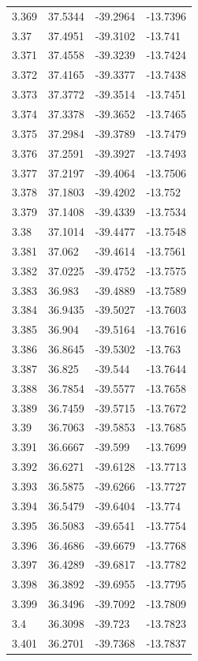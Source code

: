 \begin{tabular}{llll}
3.369 & 37.5344 & -39.2964 & -13.7396 \\
3.37 & 37.4951 & -39.3102 & -13.741 \\
3.371 & 37.4558 & -39.3239 & -13.7424 \\
3.372 & 37.4165 & -39.3377 & -13.7438 \\
3.373 & 37.3772 & -39.3514 & -13.7451 \\
3.374 & 37.3378 & -39.3652 & -13.7465 \\
3.375 & 37.2984 & -39.3789 & -13.7479 \\
3.376 & 37.2591 & -39.3927 & -13.7493 \\
3.377 & 37.2197 & -39.4064 & -13.7506 \\
3.378 & 37.1803 & -39.4202 & -13.752 \\
3.379 & 37.1408 & -39.4339 & -13.7534 \\
3.38 & 37.1014 & -39.4477 & -13.7548 \\
3.381 & 37.062 & -39.4614 & -13.7561 \\
3.382 & 37.0225 & -39.4752 & -13.7575 \\
3.383 & 36.983 & -39.4889 & -13.7589 \\
3.384 & 36.9435 & -39.5027 & -13.7603 \\
3.385 & 36.904 & -39.5164 & -13.7616 \\
3.386 & 36.8645 & -39.5302 & -13.763 \\
3.387 & 36.825 & -39.544 & -13.7644 \\
3.388 & 36.7854 & -39.5577 & -13.7658 \\
3.389 & 36.7459 & -39.5715 & -13.7672 \\
3.39 & 36.7063 & -39.5853 & -13.7685 \\
3.391 & 36.6667 & -39.599 & -13.7699 \\
3.392 & 36.6271 & -39.6128 & -13.7713 \\
3.393 & 36.5875 & -39.6266 & -13.7727 \\
3.394 & 36.5479 & -39.6404 & -13.774 \\
3.395 & 36.5083 & -39.6541 & -13.7754 \\
3.396 & 36.4686 & -39.6679 & -13.7768 \\
3.397 & 36.4289 & -39.6817 & -13.7782 \\
3.398 & 36.3892 & -39.6955 & -13.7795 \\
3.399 & 36.3496 & -39.7092 & -13.7809 \\
3.4 & 36.3098 & -39.723 & -13.7823 \\
3.401 & 36.2701 & -39.7368 & -13.7837 \\

\end{tabular}
